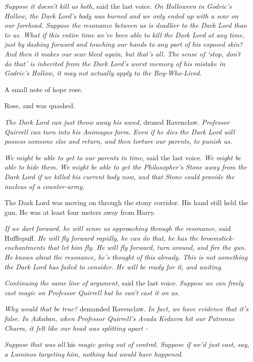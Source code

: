 \emph{Suppose it doesn't kill us both,} said the last voice. \emph{On Halloween in Godric's Hollow, the Dark Lord's body was burned and we only ended up with a scar on our forehead. Suppose the resonance between us is deadlier to the Dark Lord than to us. What if this entire time we've been able to kill the Dark Lord at any time, just by dashing forward and touching our hands to any part of his exposed skin? And then it makes our scar bleed again, but that's all. The sense of `stop, don't do that' is inherited from the Dark Lord's worst memory of his mistake in Godric's Hollow, it may not actually apply to the Boy-Who-Lived.}

A small note of hope rose.

Rose, and was quashed.

\emph{The Dark Lord can just throw away his wand,} droned Ravenclaw. \emph{Professor Quirrell can turn into his Animagus form. Even if he dies the Dark Lord will possess someone else and return, and then torture our parents, to punish us.}

\emph{We might be able to get to our parents in time,} said the last voice. \emph{We might be able to hide them. We might be able to get the Philosopher's Stone away from the Dark Lord if we killed his current body now, and that Stone could provide the nucleus of a counter-army.}

The Dark Lord was moving on through the stony corridor. His hand still held the gun. He was at least four meters away from Harry.

\emph{If we dart forward, he will sense us approaching through the resonance,} said Hufflepuff. \emph{He will fly forward rapidly, he can do that, he has the broomstick-enchantments that let him fly. He will fly forward, turn around, and fire the gun. He knows about the resonance, he's thought of this already. This is not something the Dark Lord has failed to consider. He will be ready for it, and waiting.}

\emph{Continuing the same line of argument,} said the last voice. \emph{Suppose we can freely cast magic on Professor Quirrell but he can't cast it on us.}

\emph{Why would that be true?} demanded Ravenclaw. \emph{In fact, we have evidence that it's false.} \emph{In Azkaban, when Professor Quirrell's Avada Kedavra hit our Patronus Charm, it felt like our head was splitting apart -}

\emph{Suppose that was all} his \emph{magic going out of control. Suppose if we'd just cast, say, a Luminos targeting him, nothing bad would have happened.}

